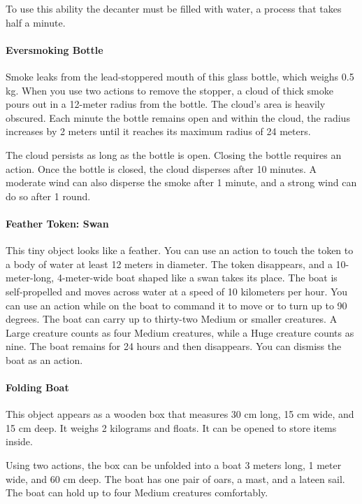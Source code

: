         To use this ability the decanter must be filled with water, a process that takes half a minute.
    \paragraph{Eversmoking Bottle}
        Smoke leaks from the lead-stoppered mouth of this glass bottle, which weighs 0.5 kg.
        When you use two actions to remove the stopper, a cloud of thick smoke pours out in a 12-meter radius from the bottle.
        The cloud's area is heavily obscured.
        Each minute the bottle remains open and within the cloud, the radius increases by 2 meters until it reaches its maximum radius of 24 meters.

        The cloud persists as long as the bottle is open.
        Closing the bottle requires an action.
        Once the bottle is closed, the cloud disperses after 10 minutes.
        A moderate wind can also disperse the smoke after 1 minute, and a strong wind can do so after 1 round.
    \paragraph{Feather Token: Swan}
        This tiny object looks like a feather.
        You can use an action to touch the token to a body of water at least 12 meters in diameter.
        The token disappears, and a 10-meter-long, 4-meter-wide boat shaped like a swan takes its place.
        The boat is self-propelled and moves across water at a speed of 10 kilometers per hour.
        You can use an action while on the boat to command it to move or to turn up to 90 degrees.
        The boat can carry up to thirty-two Medium or smaller creatures.
        A Large creature counts as four Medium creatures, while a Huge creature counts as nine.
        The boat remains for 24 hours and then disappears.
        You can dismiss the boat as an action.
    \paragraph{Folding Boat}
        This object appears as a wooden box that measures 30 cm long, 15 cm wide, and 15 cm deep.
        It weighs 2 kilograms and floats.
        It can be opened to store items inside.

        Using two actions, the box can be unfolded into a boat 3 meters long, 1 meter wide, and 60 cm deep.
        The boat has one pair of oars, a mast, and a lateen sail.
        The boat can hold up to four Medium creatures comfortably.

